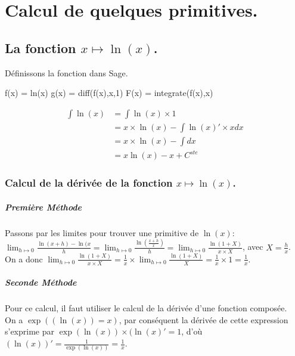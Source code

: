 \documentclass[a4paper,12pt]{report}
\begin{document}


\chapter{Calcul de quelques primitives.}

\section{La fonction  $x \mapsto \ln(x) $.}
Définissons la fonction dans Sage.
\begin{sageblock}
    f(x) = ln(x)
    g(x) = diff(f(x),x,1)
    F(x) = integrate(f(x),x)
\end{sageblock}
\begin{align*}
\int \ln(x) & =  \int \ln(x) \times 1 \\ 
& =  x \times \ln(x) - \int \ln(x)' \times x dx \\ 
& =  x \times \ln(x) - \int  dx \\ 
& =   x  \ln(x) - x + C^{ste}
\end{align*}

\subsection{Calcul de la dérivée de la fonction $x \mapsto \ln(x) $.}
\paragraph{Première Méthode}
Passons par les limites pour trouver une primitive de $\ln(x)$:\\
$ \lim_{h \mapsto 0} \frac{\ln(x+h) - \ln(x}{h} = \lim_{h \mapsto 0} \frac{\ln(\frac{x+h}{x})}{h}  = \lim_{h \mapsto 0} \frac{ \ln(1+X)}{x\times X}$, avec $X=\frac{h}{x}$.\\
On a donc 
$\lim_{h \mapsto 0} \frac{\ln(1+X)}{x\times X} = \frac{1}{x} \times \lim_{h \mapsto 0} \frac{\ln(1+X)}{X} = \frac{1}{x} \times 1 = \frac{1}{x}$.
\paragraph{Seconde Méthode}
Pour ce calcul, il faut utiliser le calcul de la dérivée d'une fonction composée. \\
On a $\exp((\ln(x))=x)$, par conséquent la dérivée de cette expression s'exprime par $ \exp(\ln(x)) \times (\ln(x)' = 1$, d'où $(\ln(x))' = \frac{1}{\exp(\ln(x))}  = \frac{1}{x} $.
\end{document}
